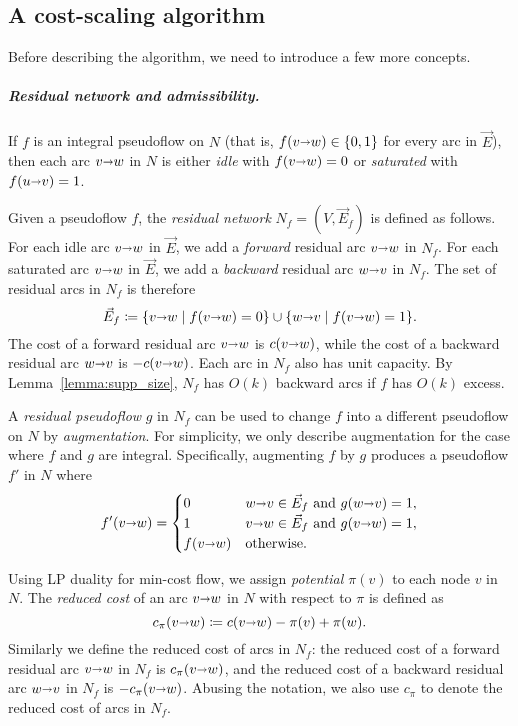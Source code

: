 \documentclass[a4paper,UKenglish]{socg-lipics-v2019}
\makeatletter
\def\arcto{\mathord\shortrightarrow}
\def\arc#1#2{#1\arcto#2}
\theoremstyle{plain}
\numberwithin{figure}{section}
\renewcommand{\paragraph}{\subparagraph}
\def\EMPH#1{\textcolor{BrickRed}{{\emph{#1}}}}
\def\n@te#1{\textsf{\boldmath \textbf{$\langle\!\langle$#1$\rangle\!\rangle$}}\leavevmode}
\def\note#1{\textcolor{red}{\n@te{#1}}}
\makeatother
\begin{document}
\subsection{A cost-scaling algorithm}
\label{SS:cost-scale}

Before describing the algorithm, we need to introduce a few more concepts.

\paragraph{Residual network and admissibility.}
If $f$ is an integral pseudoflow on $N$
(that is, $f(\arc{v}{w}) \in \{0, 1\}$ for every arc in $\vec{E}$), then each arc
$\arc{v}{w}$ in $N$ is either \EMPH{idle} with $f(\arc{v}{w}) = 0$ or
\EMPH{saturated} with $f(\arc{u}{v}) = 1$.

Given a pseudoflow $f$, the \EMPH{residual network} $N_f = (V, \vec{E}_f)$ is
defined as follows.
For each idle arc $\arc{v}{w}$ in $\vec{E}$, we add a \EMPH{forward} residual
arc $\arc{v}{w}$ in $N_f$.
For each saturated arc $\arc{v}{w}$ in $\vec{E}$, we add a \EMPH{backward}
residual arc $\arc{w}{v}$ in $N_f$.
The set of residual arcs in $N_f$ is therefore
\[
\vec{E}_f \coloneqq \{\arc{v}{w} \mid f(\arc{v}{w}) = 0\} \cup \{\arc{w}{v} \mid f(\arc{v}{w}) = 1\}.
\]
The cost of a forward residual arc $\arc{v}{w}$ is $c(\arc{v}{w})$,
while the cost of a backward residual arc $\arc{w}{v}$ is $-c(\arc{v}{w})$.
Each arc in $N_f$ also has unit capacity.
By Lemma~\ref{lemma:supp_size}, $N_f$ has $O(k)$ backward arcs if $f$ has $O(k)$ excess.

A \EMPH{residual pseudoflow} $g$ in $N_f$ can be used to change $f$ into a
different pseudoflow on $N$ by \EMPH{augmentation}.
For simplicity, we only describe augmentation for the case where $f$ and $g$ are integral.
Specifically, augmenting $f$ by $g$ produces a pseudoflow $f'$ in $N$ where
\[
f'(\arc vw) = \begin{cases}
	0 & {\arc wv} \in \vec{E}_f \text{ and } g(\arc wv) = 1, \\
	1 & {\arc vw} \in \vec{E}_f \text{ and } g(\arc vw) = 1, \\
	f(\arc vw) & \text{otherwise.}
\end{cases}
\]

Using LP duality for min-cost flow, we assign \EMPH{potential $\pi(v)$} to each node $v$ in $N$.
The \EMPH{reduced cost} of an arc $\arc{v}{w}$ in $N$ with respect to $\pi$ is
defined as
\[
c_\pi(\arc vw) \coloneqq c(\arc vw) - \pi(v) + \pi(w).
\]
Similarly we define the reduced cost of arcs in $N_f$: the reduced cost of a
forward residual arc $\arc vw$ in $N_f$ is $c_\pi(\arc vw)$, and the reduced cost of a
backward residual arc $\arc wv$ in $N_f$ is $-c_\pi(\arc vw)$.
Abusing the notation, we also use $c_\pi$ to denote the reduced cost of arcs in
$N_f$.
\end{document}
